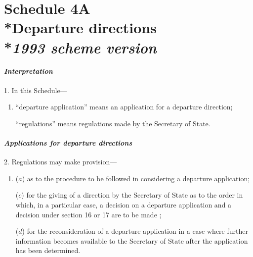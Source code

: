 \documentclass[12pt,a4paper]{article}
\begin{document}
\part[Schedule 4A --- Departure directions --- \emph{1993 scheme version}]{Schedule 4A\\*Departure directions\\*\emph{1993 scheme version}}

\renewcommand\parthead{--- Schedule 4A}


\subsection*{\itshape Interpretation}

1. In this Schedule—
\begin{enumerate}\item[]
    “departure application” means an application for a departure direction;

    “regulations” means regulations made by the Secretary of State.

\end{enumerate}


\subsection*{\itshape Applications for departure directions}

2. Regulations may make provision—
\begin{enumerate}\item[]
($a$) as to the procedure to be followed in considering a departure application;


($c$) for the giving of a direction by the Secretary of State as to the order in which, in a particular case, 
a decision on a departure application and a decision under section 16 or 17 are to be made%
;

($d$) for the reconsideration of a departure application in a case where further information becomes available to the Secretary of State after the application has been determined.
\end{enumerate}
\end{document}
